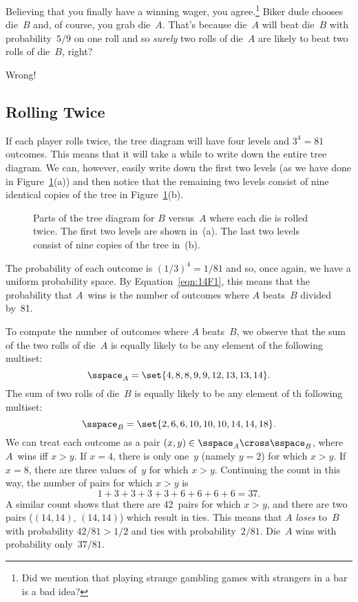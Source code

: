 Believing that you finally have a winning wager, you
agree.\footnote{Did we mention that playing strange gambling games
  with strangers in a bar is a bad idea?}  Biker dude chooses die~$B$
and, of course, you grab die~$A$.  That's because die~$A$ will beat
die~$B$ with probability~$5/9$ on one roll and so \emph{surely} two
rolls of die~$A$ are likely to beat two rolls of die~$B$, right?

Wrong!

\subsection{Rolling Twice}

If each player rolls twice, the tree diagram will have four levels and
$3^4 = 81$ outcomes.  This means that it will take a while to write
down the entire tree diagram.  We can, however, easily write down the
first two levels (as we have done in Figure~\ref{fig:14A11}(a)) and
then notice that the remaining two levels consist of nine identical
copies of the tree in Figure~\ref{fig:14A11}(b).

\begin{figure}


\caption{Parts of the tree diagram for $B$ versus~$A$ where each die
  is rolled twice.  The first two levels are shown in~(a).  The last
  two levels consist of nine copies of the tree in~(b).}

\label{fig:14A11}

\end{figure}

The probability of each outcome is $(1/3)^4 = 1/81$ and so, once
again, we have a uniform probability space.  By
Equation~\ref{eqn:14F1}, this means that the probability that $A$~wins
is the number of outcomes where $A$ beats~$B$ divided by~81.

To compute the number of outcomes where $A$ beats~$B$, we observe that
the sum of the two rolls of die~$A$ is equally likely to be any
element of the following multiset:
\begin{equation*}
    \sspace_A = \set{ 4, 8, 8, 9, 9, 12, 13, 13, 14 }.
\end{equation*}
The sum of two rolls of die~$B$ is equally likely to be any element of
th following multiset:
\begin{equation*}
    \sspace_B = \set{ 2, 6, 6, 10, 10, 10, 14, 14, 18 }.
\end{equation*}
We can treat each outcome as a pair $(x, y) \in \sspace_A
\cross \sspace_B$, where $A$~wins iff $x > y$.  If $x = 4$, there is
only one~$y$ (namely $y = 2$) for which $x > y$.  If $x = 8$, there
are three values of~$y$ for which $x > y$.  Continuing the count in
this way, the number of pairs for which $x > y$ is
\begin{equation*}
    1 + 3 + 3 + 3 + 3 + 6 + 6 + 6 + 6 = 37.
\end{equation*}
A similar count shows that there are 42~pairs for which $x > y$, and
there are two pairs ($(14, 14)$, $(14, 14)$) which result in ties.
This means that $A$ \emph{loses} to~$B$ with probability $42/81 > 1/2$
and ties with probability~$2/81$.  Die~$A$ wins with probability
only~$37/81$.

